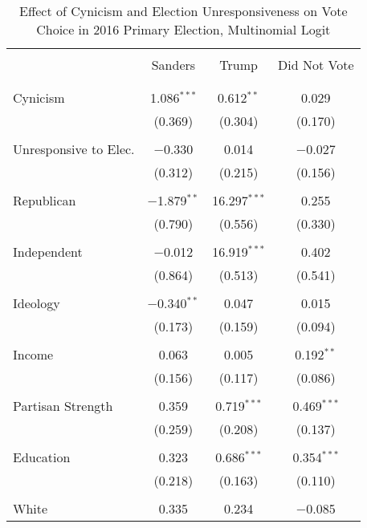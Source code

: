 \documentclass[12pt]{article}
\begin{document}
\begin{appendices}
\begin{refsection}
\begin{table}[!t] \centering 
  \caption{Effect of Cynicism and Election Unresponsiveness on Vote Choice in 2016 Primary Election, Multinomial Logit} 
  \label{tab:primary} 
   \renewcommand{\arraystretch}{0.8}
\begin{adjustbox}{width=0.6\textwidth,center}
\begin{tabular}{@{\extracolsep{5pt}}lccc} 
\\[-1.8ex]\hline 
 \\[-2ex] 
 & Sanders & Trump & Did Not Vote \\ 
\hline \\[-1.8ex] 
\hline \\[-1.8ex] 
 Cynicism & 1.086$^{***}$ & 0.612$^{**}$ & 0.029 \\ 
  & (0.369) & (0.304) & (0.170) \\ 
  & & & \\ 
 Unresponsive to Elec. & $-$0.330 & 0.014 & $-$0.027 \\ 
  & (0.312) & (0.215) & (0.156) \\ 
  & & & \\ 
 Republican & $-$1.879$^{**}$ & 16.297$^{***}$ & 0.255 \\ 
  & (0.790) & (0.556) & (0.330) \\ 
  & & & \\ 
 Independent & $-$0.012 & 16.919$^{***}$ & 0.402 \\ 
  & (0.864) & (0.513) & (0.541) \\ 
  & & & \\ 
 Ideology & $-$0.340$^{**}$ & 0.047 & 0.015 \\ 
  & (0.173) & (0.159) & (0.094) \\ 
  & & & \\ 
 Income & 0.063 & 0.005 & 0.192$^{**}$ \\ 
  & (0.156) & (0.117) & (0.086) \\ 
  & & & \\ 
 Partisan Strength & 0.359 & 0.719$^{***}$ & 0.469$^{***}$ \\ 
  & (0.259) & (0.208) & (0.137) \\ 
  & & & \\ 
 Education & 0.323 & 0.686$^{***}$ & 0.354$^{***}$ \\ 
  & (0.218) & (0.163) & (0.110) \\ 
  & & & \\ 
 White & 0.335 & 0.234 & $-$0.085 \\ 

\end{tabular}
\end{adjustbox}
\end{table}
\end{refsection}
\end{appendices}
\end{document}
